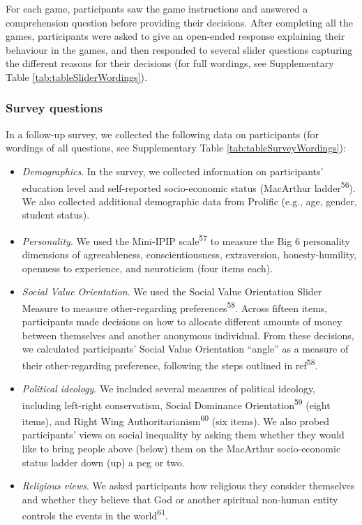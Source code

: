 \documentclass[
  man,floatsintext]{apa6}
\providecommand{\tightlist}{%
  \setlength{\itemsep}{0pt}\setlength{\parskip}{0pt}}
\begin{document}
For each game, participants saw the game instructions and answered a
comprehension question before providing their decisions. After completing all
the games, participants were asked to give an open-ended response explaining
their behaviour in the games, and then responded to several slider questions
capturing the different reasons for their decisions (for full wordings, see
Supplementary Table \ref{tab:tableSliderWordings}).

\hypertarget{survey-questions}{%
\subsubsection{Survey questions}\label{survey-questions}}

In a follow-up survey, we collected the following data on participants (for
wordings of all questions, see Supplementary Table
\ref{tab:tableSurveyWordings}):

\begin{itemize}
\tightlist
\item
  \emph{Demographics}. In the survey, we collected information on participants'
  education level and self-reported socio-economic status (MacArthur ladder\textsuperscript{56}). We also collected additional demographic data from Prolific
  (e.g., age, gender, student status).
\item
  \emph{Personality}. We used the Mini-IPIP scale\textsuperscript{57} to measure the Big 6
  personality dimensions of agreeableness, conscientiousness, extraversion,
  honesty-humility, openness to experience, and neuroticism (four items each).
\item
  \emph{Social Value Orientation}. We used the Social Value Orientation Slider
  Measure to measure other-regarding preferences\textsuperscript{58}. Across fifteen
  items, participants made decisions on how to allocate different amounts of
  money between themselves and another anonymous individual. From these
  decisions, we calculated participants' Social Value Orientation ``angle'' as a
  measure of their other-regarding preference, following the steps outlined in
  ref\textsuperscript{58}.
\item
  \emph{Political ideology}. We included several measures of political ideology,
  including left-right conservatism, Social Dominance Orientation\textsuperscript{59}
  (eight items), and Right Wing Authoritarianism\textsuperscript{60} (six items).
  We also probed participants' views on social inequality by asking them whether
  they would like to bring people above (below) them on the MacArthur
  socio-economic status ladder down (up) a peg or two.
\item
  \emph{Religious views}. We asked participants how religious they consider
  themselves and whether they believe that God or another spiritual non-human
  entity controls the events in the world\textsuperscript{61}.
\end{itemize}
\end{document}
